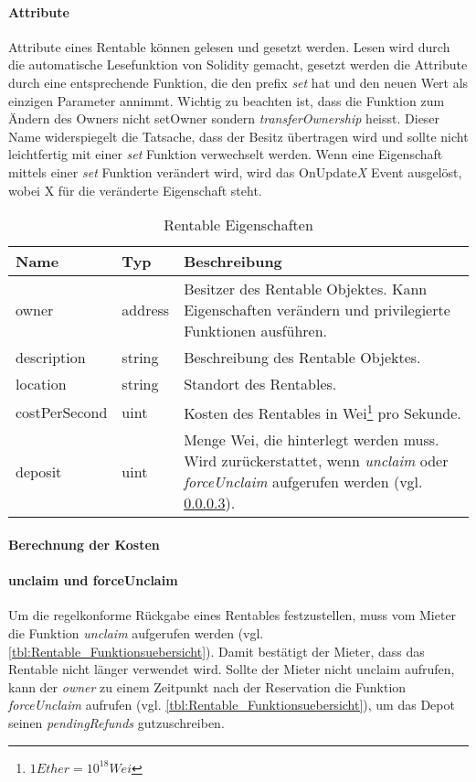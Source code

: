 \paragraph{Attribute}
\label{sys_para:Rentable_Attribute}
Attribute eines Rentable können gelesen und gesetzt werden. Lesen wird durch die automatische Lesefunktion von Solidity gemacht, gesetzt werden die Attribute durch eine entsprechende Funktion, die den prefix \emph{set} hat und den neuen Wert als einzigen Parameter annimmt. Wichtig zu beachten ist, dass die Funktion zum Ändern des Owners nicht setOwner sondern \emph{transferOwnership} heisst. Dieser Name widerspiegelt die Tatsache, dass der Besitz übertragen wird und sollte nicht leichtfertig mit einer \emph{set} Funktion verwechselt werden. Wenn eine Eigenschaft mittels einer \emph{set} Funktion verändert wird, wird das OnUpdate\emph{X} Event ausgelöst, wobei X für die veränderte Eigenschaft steht. 

\begin{longtable}{@{}llL{9cm}@{}}
\caption{Rentable Eigenschaften}\label{tbl:Rentable_Eigenschaften}\\
\toprule
Name & Typ & Beschreibung \\ \midrule
owner & address   & Besitzer des Rentable Objektes. Kann Eigenschaften verändern und privilegierte Funktionen ausführen.\\
description & string   & Beschreibung des Rentable Objektes.\\
location & string   & Standort des Rentables.\\
costPerSecond & uint   & Kosten des Rentables in Wei\footnote{$1 Ether = 10^{18}
Wei$} pro Sekunde.\\
deposit & uint & Menge Wei, die hinterlegt werden muss. Wird zurückerstattet, wenn \emph{unclaim} oder \emph{forceUnclaim} aufgerufen werden (vgl. \ref{sys_para:claim_unclaim}).\\
\end{longtable}

\paragraph{Berechnung der Kosten}

\paragraph{unclaim und forceUnclaim}
\label{sys_para:claim_unclaim}
Um die regelkonforme Rückgabe eines Rentables festzustellen, muss vom Mieter die Funktion \emph{unclaim} aufgerufen werden (vgl. \ref{tbl:Rentable_Funktionsuebersicht}). Damit bestätigt der Mieter, dass das Rentable nicht länger verwendet wird. Sollte der Mieter nicht unclaim aufrufen, kann der \emph{owner} zu einem Zeitpunkt nach der Reservation die Funktion \emph{forceUnclaim} aufrufen (vgl. \ref{tbl:Rentable_Funktionsuebersicht}), um das Depot seinen \emph{pendingRefunds} gutzuschreiben.

